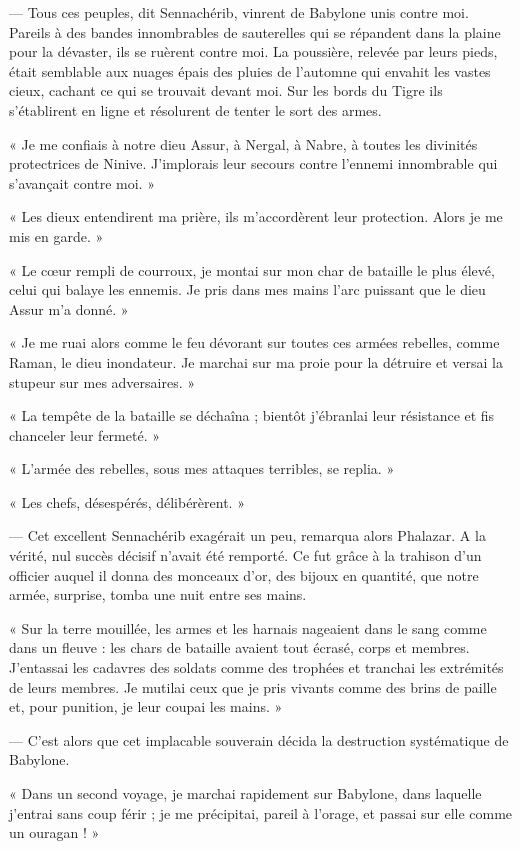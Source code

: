 \documentclass[a4paper, 11pt, oneside, polutonikogreek, french]{article}
\begin{document}
--- Tous ces peuples, dit Sennachérib, vinrent de Babylone unis contre moi. Pareils à des bandes innombrables de sauterelles qui se répandent dans la plaine pour la dévaster, ils se ruèrent contre moi. La poussière, relevée par leurs pieds, était semblable aux nuages épais des pluies de l'automne qui envahit les vastes cieux, cachant ce qui se trouvait devant moi. Sur les bords du Tigre ils s'établirent en ligne et résolurent de tenter le sort des armes.

« Je me confiais à notre dieu Assur, à Nergal, à Nabre, à toutes les divinités protectrices de Ninive. J'implorais leur secours contre l'ennemi innombrable qui s'avançait contre moi. »

« Les dieux entendirent ma prière, ils m'accordèrent leur protection. Alors je me mis en garde. »

« Le cœur rempli de courroux, je montai sur mon char de bataille le plus élevé, celui qui balaye les ennemis. Je pris dans mes mains l'arc puissant que le dieu Assur m'a donné. »

« Je me ruai alors comme le feu dévorant sur toutes ces armées rebelles, comme Raman, le dieu inondateur. Je marchai sur ma proie pour la détruire et versai la stupeur sur mes adversaires. »

« La tempête de la bataille se déchaîna ; bientôt j'ébranlai leur résistance et fis chanceler leur fermeté. »

« L'armée des rebelles, sous mes attaques terribles, se replia. »

« Les chefs, désespérés, délibérèrent. »

--- Cet excellent Sennachérib exagérait un peu, remarqua alors Phalazar. A la vérité, nul succès décisif n'avait été remporté. Ce fut grâce à la trahison d'un officier auquel il donna des monceaux d'or, des bijoux en quantité, que notre armée, surprise, tomba une nuit entre ses mains.

« Sur la terre mouillée, les armes et les harnais nageaient dans le sang comme dans un fleuve : les chars de bataille avaient tout écrasé, corps et membres. J'entassai les cadavres des soldats comme des trophées et tranchai les extrémités de leurs membres. Je mutilai ceux que je pris vivants comme des brins de paille et, pour punition, je leur coupai les mains. »

--- C'est alors que cet implacable souverain décida la destruction systématique de Babylone.

« Dans un second voyage, je marchai rapidement sur Babylone, dans laquelle j'entrai sans coup férir ; je me précipitai, pareil à l'orage, et passai sur elle comme un ouragan ! »
\end{document}
